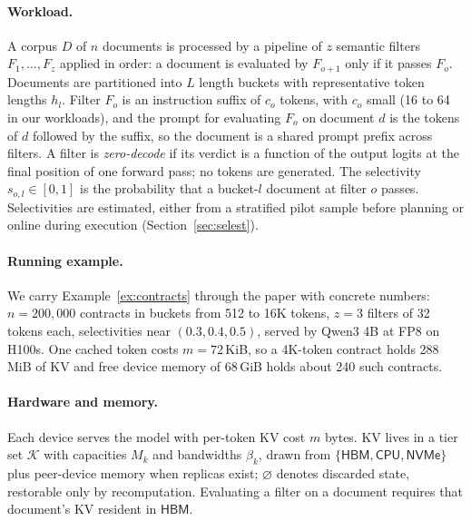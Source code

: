 \documentclass[10pt,twocolumn]{article}
\newcommand{\hbm}{\mathsf{HBM}}
\newcommand{\cpu}{\mathsf{CPU}}
\newcommand{\nvme}{\mathsf{NVMe}}
\newcommand{\none}{\varnothing}
\begin{document}
\paragraph{Workload.} A corpus $D$ of $n$ documents is processed by a pipeline of $z$ semantic filters $F_1, \dots, F_z$ applied in order: a document is evaluated by $F_{o+1}$ only if it passes $F_o$. Documents are partitioned into $L$ length buckets with representative token lengths $h_l$. Filter $F_o$ is an instruction suffix of $c_o$ tokens, with $c_o$ small (16 to 64 in our workloads), and the prompt for evaluating $F_o$ on document $d$ is the tokens of $d$ followed by the suffix, so the document is a shared prompt prefix across filters. A filter is \emph{zero-decode} if its verdict is a function of the output logits at the final position of one forward pass; no tokens are generated. The selectivity $s_{o,l} \in [0,1]$ is the probability that a bucket-$l$ document at filter $o$ passes. Selectivities are estimated, either from a stratified pilot sample before planning or online during execution (Section~\ref{sec:selest}).

\paragraph{Running example.} We carry Example~\ref{ex:contracts} through the paper with concrete numbers: $n = 200{,}000$ contracts in buckets from 512 to 16K tokens, $z = 3$ filters of 32 tokens each, selectivities near $(0.3, 0.4, 0.5)$, served by Qwen3 4B at FP8 on H100s. One cached token costs $m = 72$\,KiB, so a 4K-token contract holds 288\,MiB of KV and free device memory of 68\,GiB holds about 240 such contracts.

\paragraph{Hardware and memory.} Each device serves the model with per-token KV cost $m$ bytes. KV lives in a tier set $\mathcal{K}$ with capacities $M_k$ and bandwidths $\beta_k$, drawn from $\{\hbm, \cpu, \nvme\}$ plus peer-device memory when replicas exist; $\none$ denotes discarded state, restorable only by recomputation. Evaluating a filter on a document requires that document's KV resident in $\hbm$.
\end{document}
